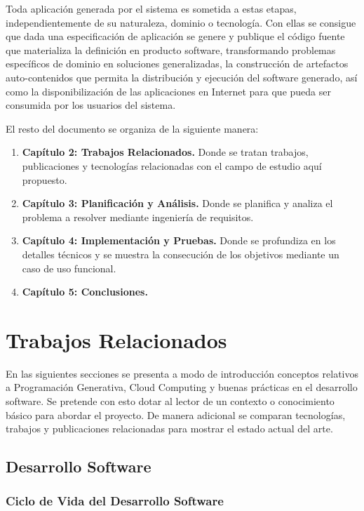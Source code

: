 \documentclass[a4paper,11pt]{book}
\begin{document}
Toda aplicación generada por el sistema es sometida a estas etapas, independientemente de su naturaleza, dominio o tecnología. Con ellas se consigue que dada una especificación de aplicación se genere y publique el código fuente que materializa la definición en producto software, transformando problemas específicos de dominio en soluciones generalizadas, la construcción de artefactos auto-contenidos que permita la distribución y ejecución del software generado, así como la disponibilización de  las aplicaciones en Internet para que pueda ser consumida por los usuarios del sistema. 

El resto del documento se organiza de la siguiente manera:

\begin{enumerate}
\item \textbf{Capítulo 2: Trabajos Relacionados.} Donde se tratan trabajos, publicaciones y tecnologías relacionadas con el campo de estudio aquí propuesto. 
\item \textbf{Capítulo 3: Planificación y Análisis.} Donde se planifica y analiza el problema  a resolver mediante ingeniería de requisitos. 
\item \textbf{Capítulo 4: Implementación  y Pruebas.} Donde se profundiza en los detalles técnicos y se muestra la consecución de los objetivos mediante un caso de uso funcional.  
\item \textbf{Capítulo 5: Conclusiones.} 
\end{enumerate}



\chapter{Trabajos Relacionados}

En las siguientes secciones se presenta a modo de introducción conceptos relativos a Programación Generativa, Cloud Computing y buenas prácticas en el desarrollo software. Se pretende con esto dotar al lector de un contexto o conocimiento básico para abordar el proyecto. De manera adicional se comparan tecnologías, trabajos y publicaciones relacionadas para mostrar el estado actual del arte. 


\section{Desarrollo Software}

\subsection{Ciclo de Vida del Desarrollo Software}
\end{document}
